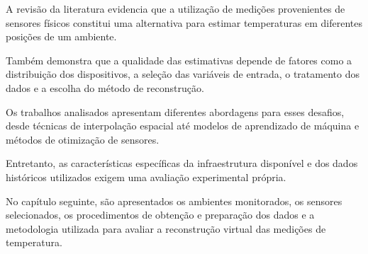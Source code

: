 A revisão da literatura evidencia que a utilização de medições provenientes de sensores físicos constitui uma alternativa para estimar temperaturas em diferentes posições de um ambiente.

Também demonstra que a qualidade das estimativas depende de fatores como a distribuição dos dispositivos, a seleção das variáveis de entrada, o tratamento dos dados e a escolha do método de reconstrução.

Os trabalhos analisados apresentam diferentes abordagens para esses desafios, desde técnicas de interpolação espacial até modelos de aprendizado de máquina e métodos de otimização de sensores.

Entretanto, as características específicas da infraestrutura disponível e dos dados históricos utilizados exigem uma avaliação experimental própria.

No capítulo seguinte, são apresentados os ambientes monitorados, os sensores selecionados, os procedimentos de obtenção e preparação dos dados e a metodologia utilizada para avaliar a reconstrução virtual das medições de temperatura.